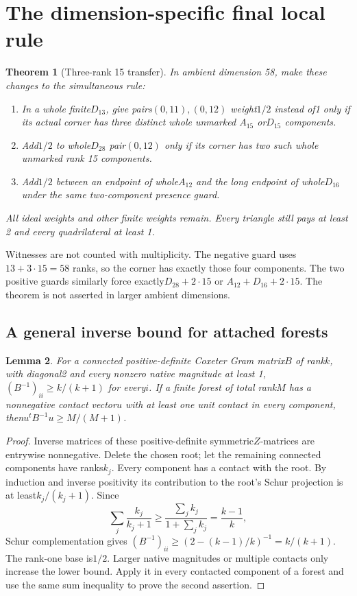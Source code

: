\documentclass[11pt]{article}
\newtheorem{theorem}{Theorem}
\newtheorem{lemma}[theorem]{Lemma}
\theoremstyle{remark}\newtheorem{remark}[theorem]{Remark}
\begin{document}
\section{The dimension-specific final local rule}
\begin{theorem}[Three-rank 15 transfer]\label{thm:local}
In ambient dimension 58, make these changes to the simultaneous rule:
\begin{enumerate}
\item In a whole finite$D_{13}$, give pairs$(0,11),(0,12)$ weight$1/2$
instead of1 only if its actual corner has three distinct whole unmarked
$A_{15}$ or$D_{15}$ components.
\item Add$1/2$ to whole$D_{28}$ pair$(0,12)$ only if its corner has two
such whole unmarked rank 15 components.
\item Add$1/2$ between an endpoint of whole$A_{12}$ and the long endpoint
of whole$D_{16}$ under the same two-component presence guard.
\end{enumerate}
All ideal weights and other finite weights remain. Every triangle still
pays at least 2 and every quadrilateral at least 1.
\end{theorem}
Witnesses are not counted with multiplicity. The negative guard uses
$13+3\cdot15=58$ ranks, so the corner has exactly those four components.
The two positive guards similarly force exactly$D_{28}+2\cdot15$ or
$A_{12}+D_{16}+2\cdot15$. The theorem is not asserted in larger ambient
dimensions.

\subsection{A general inverse bound for attached forests}
\begin{lemma}\label{lem:inverse}
For a connected positive-definite Coxeter Gram matrix$B$ of rank$k$,
with diagonal2 and every nonzero native magnitude at least 1,
$(B^{-1})_{ii}\ge k/(k+1)$ for every$i$. If a finite forest of total
rank$M$ has a nonnegative contact vector$u$ with at least one unit contact
in every component, then$u^tB^{-1}u\ge M/(M+1)$.
\end{lemma}
\begin{proof}
Inverse matrices of these positive-definite symmetric$Z$-matrices are
entrywise nonnegative. Delete the chosen root; let the remaining connected
components have ranks$k_j$. Every component has a contact with the root.
By induction and inverse positivity its contribution to the root's Schur
projection is at least$k_j/(k_j+1)$. Since
\[
 \sum_j\frac{k_j}{k_j+1}\ge\frac{\sum_jk_j}{1+\sum_jk_j}
 =\frac{k-1}{k},
\]
Schur complementation gives
$(B^{-1})_{ii}\ge(2-(k-1)/k)^{-1}=k/(k+1)$.
The rank-one base is$1/2$. Larger native magnitudes or multiple contacts
only increase the lower bound. Apply it in every contacted component of
a forest and use the same sum inequality to prove the second assertion.
\end{proof}
\end{document}
